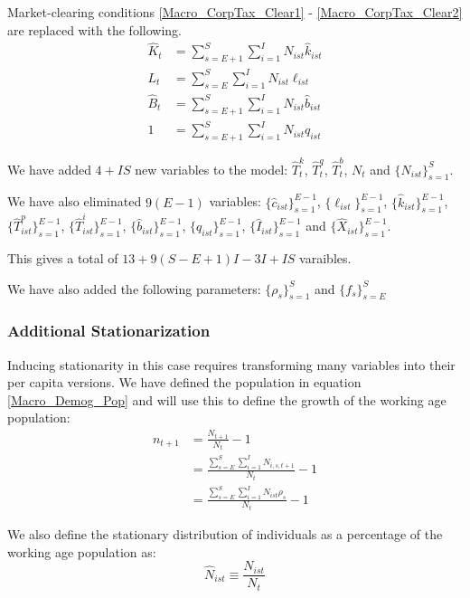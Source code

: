 \documentclass[letterpaper,12pt]{article}
\theoremstyle{definition}
\numberwithin{equation}{section}
\begin{document}
\begin{spacing}{1.5}
    Market-clearing conditions \eqref{Macro_CorpTax_Clear1} - \eqref{Macro_CorpTax_Clear2} are replaced with the following.
    \begin{align}
    \hat K_t & = \sum_{s=E+1}^S \sum_{i=1}^I N_{ist} \hat k_{ist} \label{Macro_Demog_Clear1}\\
    L_t & = \sum_{s=E}^S \sum_{i=1}^I N_{ist} \ell_{ist} \label{Macro_Demog_Clear2}\\
    \hat B_t & = \sum_{s=E+1}^S \sum_{i=1}^I N_{ist} \hat b_{ist} \label{Macro_Demog_Clear3}\\
    1 & = \sum_{s=E+1}^S \sum_{i=1}^I N_{ist} q_{ist} \label{Macro_Demog_Clear4}
    \end{align}  

    We have added $4 + IS$ new variables to the model: $\hat T^k_t$, $\hat T^q_t$, $\hat T^b_t$, $N_t$ and $\{N_{ist}\}_{s=1}^S$.

    We have also eliminated $9(E-1)$ variables: $\{\hat c_{ist}\}_{s=1}^{E-1}$, $\{\ell_{ist}\}_{s=1}^{E-1}$, $\{\hat k_{ist}\}_{s=1}^{E-1}$, $\{\hat T^p_{ist}\}_{s=1}^{E-1}$, $\{\hat T^i_{ist}\}_{s=1}^{E-1}$, $\{\hat b_{ist}\}_{s=1}^{E-1}$, $\{q_{ist}\}_{s=1}^{E-1}$, $\{\hat I_{ist}\}_{s=1}^{E-1}$ and $\{\hat X_{ist}\}_{s=1}^{E-1}$.

    This gives a total of $13 + 9(S-E+1)I - 3I + IS$ varaibles.

    We have also added the following parameters: $\{\rho_s\}_{s=1}^S$ and $\{f_s\}_{s=E}^S$

  \subsubsection{Additional Stationarization}

    Inducing stationarity in this case requires transforming many variables into their per capita versions.  We have defined the population in equation \eqref{Macro_Demog_Pop} and will use this to define the growth of the working age population:
    \begin{align}
    n_{t+1} & = \frac{N_{t+1}}{N_t} - 1 \nonumber \\
    & = \frac{\sum_{s=E}^S \sum_{i=1}^I N_{i,s,t+1}}{N_t} - 1 \nonumber\\
    & = \frac{\sum_{s=E}^S \sum_{i=1}^I N_{ist} \rho_s}{N_t} - 1 \nonumber
    \end{align}

    We also define the stationary distribution of individuals as a percentage of the working age population as:
    \begin{equation}
    \hat N_{ist} \equiv \frac{N_{ist}}{N_t} \nonumber
    \end{equation}


\end{spacing}
\end{document}
